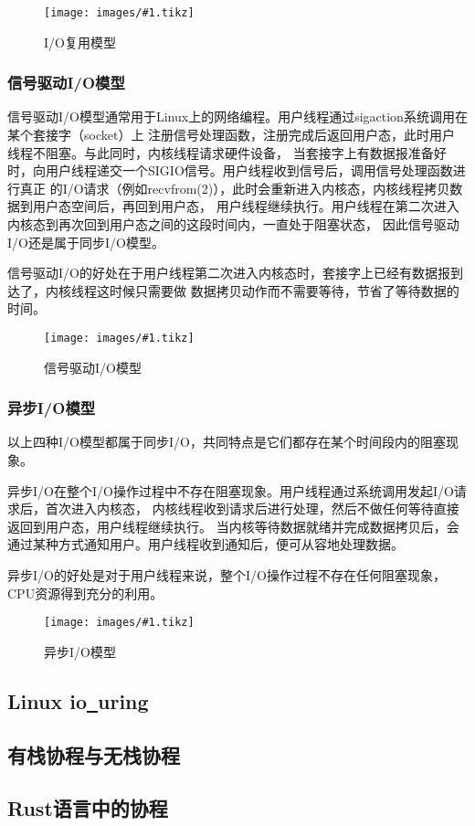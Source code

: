 \documentclass[supercite]{HustGraduPaper}
\newcommand{\cfig}[3]{
  \begin{figure}[htb]
    \centering
    \texttt{[image: images/\#1.tikz]}
    \caption{#3}
    \label{fig:#1}
  \end{figure}
}
\theoremstyle{definition}
\begin{document}
\cfig{io-multiplex}{0.7}{I/O复用模型}

\subsubsection{信号驱动I/O模型}
信号驱动I/O模型通常用于Linux上的网络编程。用户线程通过sigaction系统调用在某个套接字（socket）上
注册信号处理函数，注册完成后返回用户态，此时用户线程不阻塞。与此同时，内核线程请求硬件设备，
当套接字上有数据报准备好时，向用户线程递交一个SIGIO信号。用户线程收到信号后，调用信号处理函数进行真正
的I/O请求（例如recvfrom(2)），此时会重新进入内核态，内核线程拷贝数据到用户态空间后，再回到用户态，
用户线程继续执行。用户线程在第二次进入内核态到再次回到用户态之间的这段时间内，一直处于阻塞状态，
因此信号驱动I/O还是属于同步I/O模型。\par

信号驱动I/O的好处在于用户线程第二次进入内核态时，套接字上已经有数据报到达了，内核线程这时候只需要做
数据拷贝动作而不需要等待，节省了等待数据的时间。\par

\cfig{signal-driven}{0.7}{信号驱动I/O模型}

\subsubsection{异步I/O模型}
以上四种I/O模型都属于同步I/O，共同特点是它们都存在某个时间段内的阻塞现象。\par

异步I/O在整个I/O操作过程中不存在阻塞现象。用户线程通过系统调用发起I/O请求后，首次进入内核态，
内核线程收到请求后进行处理，然后不做任何等待直接返回到用户态，用户线程继续执行。
当内核等待数据就绪并完成数据拷贝后，会通过某种方式通知用户。用户线程收到通知后，便可从容地处理数据。\par

异步I/O的好处是对于用户线程来说，整个I/O操作过程不存在任何阻塞现象，CPU资源得到充分的利用。\par

\cfig{async-io}{0.7}{异步I/O模型}

\subsection{Linux io\underline{~}uring}
\subsection{有栈协程与无栈协程}
\subsection{Rust语言中的协程}
\end{document}

